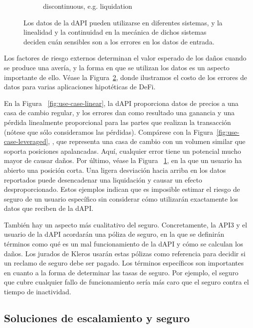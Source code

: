 \documentclass[11pt]{article}
\begin{document}
\begin{figure}[!t]
\begin{subfigure}{0.38\textwidth}
         \caption{discontinuous, e.g. liquidation}
         \label{fig:use-case-discontinuous}
     \end{subfigure}
    \caption{Los datos de la dAPI pueden utilizarse en diferentes sistemas, y la linealidad y la continuidad en la mecánica de dichos sistemas deciden cuán sensibles son a los errores en los datos de entrada.}
    \label{fig:use-case-types}
\end{figure}

Los factores de riesgo externos determinan el valor esperado de los daños cuando se produce una avería, y la forma en que se utilizan los datos es un aspecto importante de ello. Véase la Figura~\ref{fig:use-case-types}, donde ilustramos el costo de los errores de datos para varias aplicaciones hipotéticas de DeFi.

En la Figura ~\ref{fig:use-case-linear}, la dAPI proporciona datos de precios a una casa de cambio regular, y los errores dan como resultado una ganancia y una pérdida linealmente proporcional para las partes que realizan la transacción (nótese que sólo consideramos las pérdidas). Compárese con la Figura~\ref{fig:use-case-leveraged}, , que representa una casa de cambio con un volumen similar que soporta posiciones apalancadas. Aquí, cualquier error tiene un potencial mucho mayor de causar daños. Por último, véase la Figura ~\ref{fig:use-case-discontinuous}, en la que un usuario ha abierto una posición corta. Una ligera desviación hacia arriba en los datos reportados puede desencadenar una liquidación y causar un efecto desproporcionado. Estos ejemplos indican que es imposible estimar el riesgo de seguro de un usuario específico sin considerar cómo utilizarán exactamente los datos que reciben de la dAPI.

También hay un aspecto más cualitativo del seguro. Concretamente, la API3 y el usuario de la dAPI acordarán una póliza de seguro, en la que se definirán términos como qué es un mal funcionamiento de la dAPI y cómo se calculan los daños. Los jurados de Kleros usarán estas pólizas como referencia para decidir si un reclamo de seguro debe ser pagado. Los términos específicos son importantes en cuanto a la forma de determinar las tasas de seguro. Por ejemplo, el seguro que cubre cualquier fallo de funcionamiento sería más caro que el seguro contra el tiempo de inactividad.

\subsection{Soluciones de escalamiento y seguro}
\label{sec:scaling-solutions-and-insurance}
\end{document}

